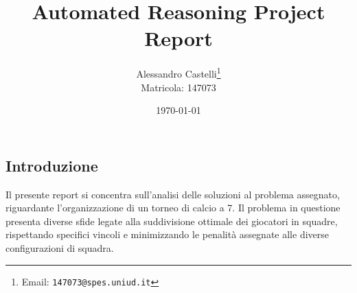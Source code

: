 \documentclass{article}
\begin{document}

\title{Automated Reasoning Project Report}
\author{
    Alessandro Castelli\thanks{Email: \texttt{147073@spes.uniud.it}} \\
    Matricola: 147073
}

\date{\today} 


\maketitle
\thispagestyle{empty}  
\newpage
\captionsetup[table]{skip=10pt} 
\tableofcontents
\setcounter{page}{1}
\pagestyle{fancy}
\fancyhf{}
\fancyfoot[C]{\thepage}
\renewcommand{\headrulewidth}{0pt}

\newpage
\begin{multicols*}{2}
\section{Introduzione}
Il presente report si concentra sull'analisi delle soluzioni al problema assegnato, 
riguardante l'organizzazione di un torneo di calcio a 7. 
Il problema in questione presenta diverse sfide legate alla suddivisione ottimale dei giocatori in squadre, 
rispettando specifici vincoli e minimizzando le penalità assegnate alle diverse configurazioni di squadra.


\end{multicols*}
\end{document}
